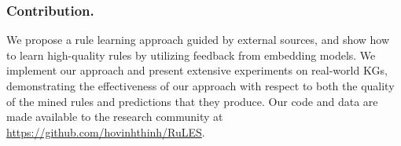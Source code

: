 \documentclass{llncs}
\begin{document}
\subsubsection{Contribution.}
We propose a rule learning approach  guided by external sources,
	 and show how to learn high-quality rules by utilizing feedback from embedding models. 
We implement our approach and present extensive experiments on real-world KGs,
demonstrating the effectiveness of our approach with respect to both %
the quality of the mined rules and predictions that they produce. 
Our code and data %
are made available to the research community at
\url{https://github.com/hovinhthinh/RuLES}.




\vspace{-.2cm}


\end{document}

